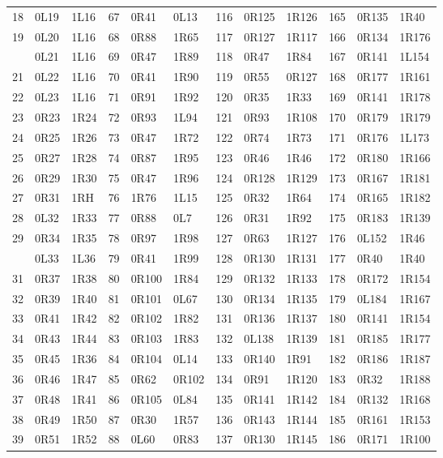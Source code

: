 \begin{center}
\begin{tabular}{rll@{\hspace{16pt}}rll@{\hspace{16pt}}rll@{\hspace{16pt}}rll}
18 & 0L19 & 1L16 & 67 & 0R41 & 0L13 & 116 & 0R125 & 1R126 & 165 & 0R135 & 1R40\\
19 & 0L20 & 1L16 & 68 & 0R88 & 1R65 & 117 & 0R127 & 1R117 & 166 & 0R134 & 1R176\\
\addlinespace[2pt]
20 & 0L21 & 1L16 & 69 & 0R47 & 1R89 & 118 & 0R47 & 1R84 & 167 & 0R141 & 1L154\\
21 & 0L22 & 1L16 & 70 & 0R41 & 1R90 & 119 & 0R55 & 0R127 & 168 & 0R177 & 1R161\\
22 & 0L23 & 1L16 & 71 & 0R91 & 1R92 & 120 & 0R35 & 1R33 & 169 & 0R141 & 1R178\\
23 & 0R23 & 1R24 & 72 & 0R93 & 1L94 & 121 & 0R93 & 1R108 & 170 & 0R179 & 1R179\\
24 & 0R25 & 1R26 & 73 & 0R47 & 1R72 & 122 & 0R74 & 1R73 & 171 & 0R176 & 1L173\\
25 & 0R27 & 1R28 & 74 & 0R87 & 1R95 & 123 & 0R46 & 1R46 & 172 & 0R180 & 1R166\\
26 & 0R29 & 1R30 & 75 & 0R47 & 1R96 & 124 & 0R128 & 1R129 & 173 & 0R167 & 1R181\\
27 & 0R31 & 1RH & 76 & 1R76 & 1L15 & 125 & 0R32 & 1R64 & 174 & 0R165 & 1R182\\
28 & 0L32 & 1R33 & 77 & 0R88 & 0L7 & 126 & 0R31 & 1R92 & 175 & 0R183 & 1R139\\
29 & 0R34 & 1R35 & 78 & 0R97 & 1R98 & 127 & 0R63 & 1R127 & 176 & 0L152 & 1R46\\
\addlinespace[2pt]
30 & 0L33 & 1L36 & 79 & 0R41 & 1R99 & 128 & 0R130 & 1R131 & 177 & 0R40 & 1R40\\
31 & 0R37 & 1R38 & 80 & 0R100 & 1R84 & 129 & 0R132 & 1R133 & 178 & 0R172 & 1R154\\
32 & 0R39 & 1R40 & 81 & 0R101 & 0L67 & 130 & 0R134 & 1R135 & 179 & 0L184 & 1R167\\
33 & 0R41 & 1R42 & 82 & 0R102 & 1R82 & 131 & 0R136 & 1R137 & 180 & 0R141 & 1R154\\
34 & 0R43 & 1R44 & 83 & 0R103 & 1R83 & 132 & 0L138 & 1R139 & 181 & 0R185 & 1R177\\
35 & 0R45 & 1R36 & 84 & 0R104 & 0L14 & 133 & 0R140 & 1R91 & 182 & 0R186 & 1R187\\
36 & 0R46 & 1R47 & 85 & 0R62 & 0R102 & 134 & 0R91 & 1R120 & 183 & 0R32 & 1R188\\
37 & 0R48 & 1R41 & 86 & 0R105 & 0L84 & 135 & 0R141 & 1R142 & 184 & 0R132 & 1R168\\
38 & 0R49 & 1R50 & 87 & 0R30 & 1R57 & 136 & 0R143 & 1R144 & 185 & 0R161 & 1R153\\
39 & 0R51 & 1R52 & 88 & 0L60 & 0R83 & 137 & 0R130 & 1R145 & 186 & 0R171 & 1R100\\

\end{tabular}
\end{center}
